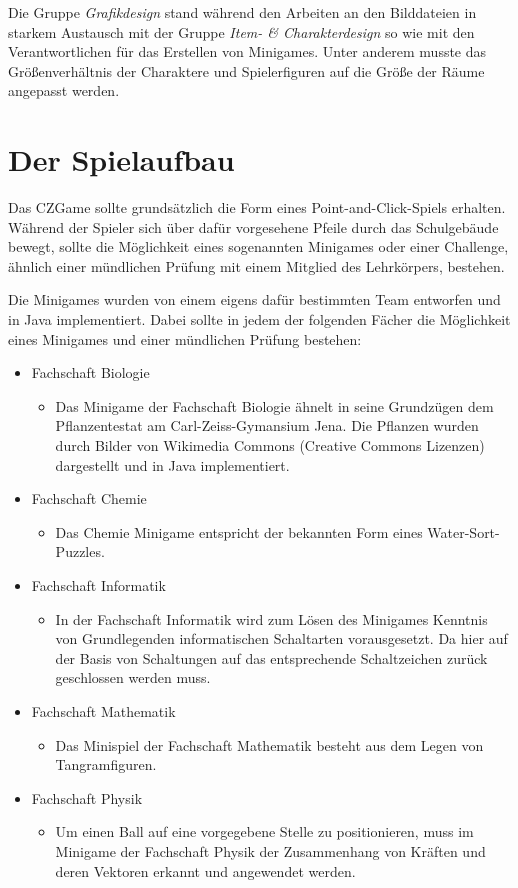 Die Gruppe \emph{Grafikdesign} stand während den Arbeiten an den Bilddateien in starkem Austausch mit der Gruppe \emph{Item- \& Charakterdesign} so wie mit den Verantwortlichen für das Erstellen von Minigames. Unter anderem musste das Größenverhältnis der Charaktere und Spielerfiguren auf die Größe der Räume angepasst werden. 


\section{Der Spielaufbau}

Das CZGame sollte grundsätzlich die Form eines Point-and-Click-Spiels erhalten. Während der Spieler sich über dafür vorgesehene Pfeile durch das Schulgebäude bewegt, sollte die Möglichkeit eines sogenannten Minigames oder einer Challenge, ähnlich einer mündlichen Prüfung mit einem Mitglied des Lehrkörpers, bestehen.

Die Minigames wurden von einem eigens dafür bestimmten Team entworfen und in Java implementiert. 
Dabei sollte in jedem der folgenden Fächer die Möglichkeit eines Minigames und einer mündlichen Prüfung bestehen:
\begin{itemize}
    \item Fachschaft Biologie
        \begin{itemize}
        \item Das Minigame der Fachschaft Biologie ähnelt in seine Grundzügen dem Pflanzentestat am Carl-Zeiss-Gymansium Jena. Die Pflanzen wurden durch Bilder von Wikimedia Commons (Creative Commons Lizenzen) dargestellt und in Java implementiert.
        \end{itemize}
    \item Fachschaft Chemie
        \begin{itemize}
        \item Das Chemie Minigame entspricht der bekannten Form eines Water-Sort-Puzzles.
        \end{itemize}
    \item Fachschaft Informatik
        \begin{itemize}
        \item In der Fachschaft Informatik wird zum Lösen des Minigames Kenntnis von Grundlegenden informatischen Schaltarten vorausgesetzt. Da hier auf der Basis von Schaltungen auf das entsprechende Schaltzeichen zurück geschlossen werden muss.
        \end{itemize}
    \item Fachschaft Mathematik
        \begin{itemize}
        \item Das Minispiel der Fachschaft Mathematik besteht aus dem Legen von Tangramfiguren.
        \end{itemize}
    \item Fachschaft Physik
        \begin{itemize}
        \item Um einen Ball auf eine vorgegebene Stelle zu positionieren, muss im Minigame der Fachschaft Physik der Zusammenhang von Kräften und deren Vektoren erkannt und angewendet werden. 
        \end{itemize}
\end{itemize}

